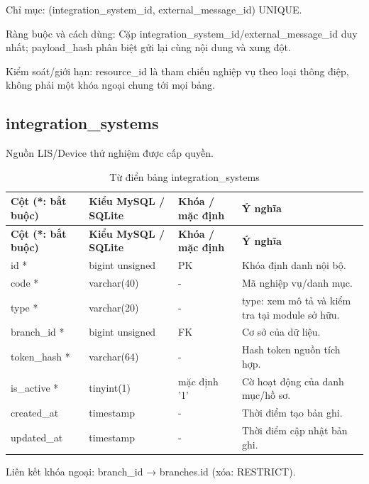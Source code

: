 Chỉ mục:\allowbreak{} (integration\_\allowbreak{}system\_\allowbreak{}id, external\_\allowbreak{}message\_\allowbreak{}id) UNIQUE.\allowbreak{}

Ràng buộc và cách dùng:\allowbreak{} Cặp integration\_\allowbreak{}system\_\allowbreak{}id/\allowbreak{}external\_\allowbreak{}message\_\allowbreak{}id duy nhất; payload\_\allowbreak{}hash phân biệt gửi lại cùng nội dung và xung đột.\allowbreak{}

Kiểm soát/\allowbreak{}giới hạn:\allowbreak{} resource\_\allowbreak{}id là tham chiếu nghiệp vụ theo loại thông điệp, không phải một khóa ngoại chung tới mọi bảng.\allowbreak{}

\clearpage

\subsection{integration\_\allowbreak{}systems}
Nguồn LIS/\allowbreak{}Device thử nghiệm được cấp quyền.\allowbreak{}


{\fontsize{10}{12}\selectfont\setlength{\tabcolsep}{3pt}\renewcommand{\arraystretch}{1.12}
\begin{longtable}{@{}L{\textwidth-4.86pt\relax} L{\textwidth-3.96pt\relax} L{\textwidth-2.88pt\relax} L{\textwidth-6.3pt\relax}@{}}
\caption{Từ điển bảng integration\_\allowbreak{}systems}\\
\toprule
\textbf{Cột (*:\allowbreak{} bắt buộc)} & \textbf{Kiểu My\allowbreak{}SQL /\allowbreak{} SQLite} & \textbf{Khóa /\allowbreak{} mặc định} & \textbf{Ý nghĩa}\\\midrule
\endfirsthead
\toprule
\textbf{Cột (*:\allowbreak{} bắt buộc)} & \textbf{Kiểu My\allowbreak{}SQL /\allowbreak{} SQLite} & \textbf{Khóa /\allowbreak{} mặc định} & \textbf{Ý nghĩa}\\\midrule
\endhead
\bottomrule\endlastfoot
id * & bigint unsigned & PK & Khóa định danh nội bộ.\allowbreak{}\\[1pt]
code * & varchar(40) & - & Mã nghiệp vụ/\allowbreak{}danh mục.\allowbreak{}\\[1pt]
type * & varchar(20) & - & type:\allowbreak{} xem mô tả và kiểm tra tại module sở hữu.\allowbreak{}\\[1pt]
branch\_\allowbreak{}id * & bigint unsigned & FK & Cơ sở của dữ liệu.\allowbreak{}\\[1pt]
token\_\allowbreak{}hash * & varchar(64) & - & Hash token nguồn tích hợp.\allowbreak{}\\[1pt]
is\_\allowbreak{}active * & tinyint(1) & mặc định '1' & Cờ hoạt động của danh mục/\allowbreak{}hồ sơ.\allowbreak{}\\[1pt]
created\_\allowbreak{}at & timestamp & - & Thời điểm tạo bản ghi.\allowbreak{}\\[1pt]
updated\_\allowbreak{}at & timestamp & - & Thời điểm cập nhật bản ghi.\allowbreak{}\\[1pt]
\end{longtable}}
Liên kết khóa ngoại:\allowbreak{} branch\_\allowbreak{}id → branches.\allowbreak{}id (xóa:\allowbreak{} RESTRICT).\allowbreak{}

